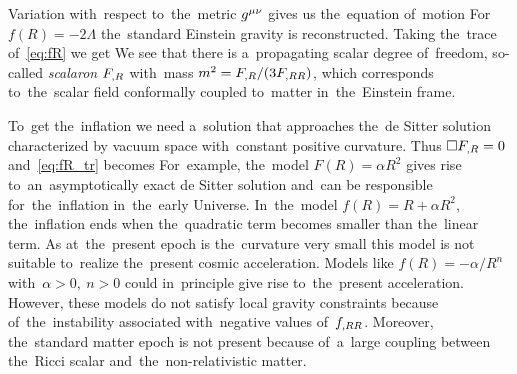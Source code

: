 Variation with~respect to~the~metric $g^{\mu\nu}$ gives us the~equation of~motion
For~$f(R)=-2\Lambda$ the~standard Einstein gravity is reconstructed. Taking the~trace of~\eqref{eq:fR} we get
We see that there is a~propagating scalar degree of~freedom, so-called \textit{scalaron} $F_{,R}$ with~mass $m^2=F_{,R}/(3F_{,RR})$, which corresponds to~the~scalar field conformally coupled to~matter in~the~Einstein frame.

To~get the~inflation we need a~solution that approaches the~de Sitter solution characterized by vacuum space with~constant positive curvature. Thus $\Box F_{,R}=0$ and~\eqref{eq:fR_tr} becomes
For~example, the~model $F(R)=\alpha R^2$ gives rise to~an~asymptotically exact de Sitter solution and~can be responsible for~the~inflation in~the~early Universe. In~the~model $f(R) = R + \alpha R^2$, the~inflation ends when the~quadratic term becomes smaller than the~linear term. As at~the~present epoch is the~curvature very small this model is not suitable to~realize the~present cosmic acceleration. Models like $f(R)=-\alpha/R^n$ with~$\alpha>0,\ n>0$ could in~principle give rise to~the~present acceleration. However, these models do not satisfy local gravity constraints because of~the~instability associated with~negative values of~$f_{,RR}$. Moreover, the~standard matter epoch is not present because of~a~large coupling between the~Ricci scalar and~the~non-relativistic matter.

